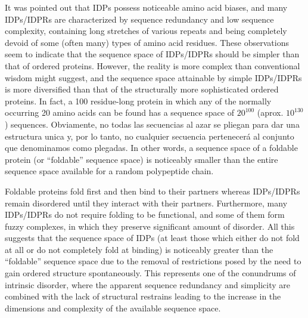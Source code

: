 It was pointed out that IDPs possess noticeable amino acid biases, and many IDPs/IDPRs are characterized by sequence redundancy and low sequence
complexity, containing long stretches of various repeats and being completely devoid of some (often many) types of amino acid residues. 
These observations seem to indicate that the sequence space of IDPs/IDPRs should be simpler than that of ordered proteins.
However, the reality is more complex than conventional wisdom might suggest, and the sequence space attainable by simple IDPs/IDPRs is more diversified than that of the structurally more sophisticated ordered proteins.
In fact, a 100 residue-long protein in which any of the normally occurring 20 amino acids can be found has a sequence space of $20^100$ (aprox. $10^130$) sequences. 
Obviamente, no todas las secuencias al azar se pliegan para dar una estructura unica y, por lo tanto, no cualquier secuencia pertenecerá al conjunto que denominamos como plegadas.
In other words, a sequence space of a foldable protein (or “foldable” sequence space) is noticeably smaller than the entire sequence space available for a random polypeptide chain\cite{dill1999polymer}. 

Foldable proteins fold first and then bind to their partners whereas IDPs/IDPRs remain disordered until they interact with their partners. 
Furthermore, many IDPs/IDPRs do not require folding to be functional, and some of them form fuzzy complexes, in which they preserve significant amount of disorder. 
All this suggests that the sequence space of IDPs (at least those which either do not fold at all or do not completely fold at binding) 
is noticeably greater than the “foldable” sequence space due to the removal of restrictions posed by the need to gain ordered structure spontaneously. 
This represents one of the conundrums of intrinsic disorder, where the apparent sequence redundancy and simplicity are combined with the lack of structural restrains leading to the increase in the dimensions and complexity of the
available sequence space.


% 


